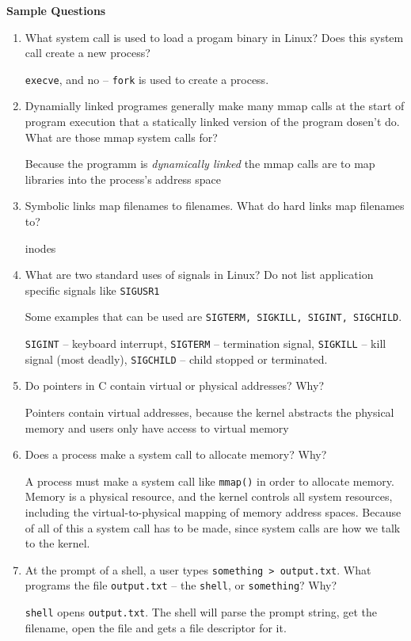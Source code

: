 \pagebreak
\begin{center}
  \Large \textbf{Sample Questions}
\end{center}
\begin{enumerate}
\item What system call is used to load a progam binary in Linux? Does this
  system call create a new process?
  \begin{ans}
    \texttt{execve}, and no -- \texttt{fork} is used to create a process.
  \end{ans}
\item Dynamially linked programes generally make many mmap calls at the start of
  program execution that a statically linked version of the program dosen't do.
  What are those mmap system calls for?
  \begin{ans}
    Because the programm is \textit{dynamically linked} the mmap calls are to
    map libraries into the process's address space
  \end{ans}
\item Symbolic links map filenames to filenames. What do hard links map
  filenames to?
  \begin{ans}
    inodes
  \end{ans}
\item What are two standard uses of signals in Linux? Do not list application
  specific signals like \texttt{SIGUSR1}
  \begin{ans}
    Some examples that can be used are \texttt{SIGTERM, SIGKILL, SIGINT,
      SIGCHILD}.

    \texttt{SIGINT} -- keyboard interrupt, \texttt{SIGTERM} -- termination
    signal, \texttt{SIGKILL} -- kill signal (most deadly), \texttt{SIGCHILD} --
    child stopped or terminated.
  \end{ans}
\item Do pointers in C contain virtual or physical addresses? Why?
  \begin{ans}
    Pointers contain virtual addresses, because the kernel abstracts the
    physical memory and users only have access to virtual memory
  \end{ans}
\item Does a process make a system call to allocate memory? Why?
  \begin{ans}
    A process must make a system call like \texttt{mmap()} in order to allocate
    memory. Memory is a physical resource, and the kernel controls all system
    resources, including the virtual-to-physical mapping of memory address
    spaces. Because of all of this a system call has to be made, since system
    calls are how we talk to the kernel.
  \end{ans}
\item At the prompt of a shell, a user types \texttt{something > output.txt}.
  What programs the file \texttt{output.txt} -- the \texttt{shell}, or
  \texttt{something}? Why?
  \begin{ans}
    \texttt{shell} opens \texttt{output.txt}. The shell will parse the prompt
    string, get the filename, open the file and gets a file descriptor for it.


\end{ans}
\end{enumerate}
